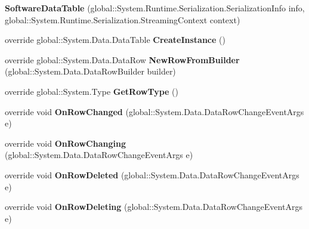 \begin{DoxyCompactItemize}
\item 
{\bfseries Software\+Data\+Table} (global\+::\+System.\+Runtime.\+Serialization.\+Serialization\+Info info, global\+::\+System.\+Runtime.\+Serialization.\+Streaming\+Context context)\hypertarget{class_products_1_1_data_1_1ds_sage_1_1_software_data_table_a21290d753abcb951ecbcf30235f61fa4}{}\label{class_products_1_1_data_1_1ds_sage_1_1_software_data_table_a21290d753abcb951ecbcf30235f61fa4}

\item 
override global\+::\+System.\+Data.\+Data\+Table {\bfseries Create\+Instance} ()\hypertarget{class_products_1_1_data_1_1ds_sage_1_1_software_data_table_acdc99b08466fa9d667b12b3eeaae30e8}{}\label{class_products_1_1_data_1_1ds_sage_1_1_software_data_table_acdc99b08466fa9d667b12b3eeaae30e8}

\item 
override global\+::\+System.\+Data.\+Data\+Row {\bfseries New\+Row\+From\+Builder} (global\+::\+System.\+Data.\+Data\+Row\+Builder builder)\hypertarget{class_products_1_1_data_1_1ds_sage_1_1_software_data_table_a4c9b406f366788eb3f6344f287d3d9a5}{}\label{class_products_1_1_data_1_1ds_sage_1_1_software_data_table_a4c9b406f366788eb3f6344f287d3d9a5}

\item 
override global\+::\+System.\+Type {\bfseries Get\+Row\+Type} ()\hypertarget{class_products_1_1_data_1_1ds_sage_1_1_software_data_table_aa6852295cfe18ea9c7f15f12050b0051}{}\label{class_products_1_1_data_1_1ds_sage_1_1_software_data_table_aa6852295cfe18ea9c7f15f12050b0051}

\item 
override void {\bfseries On\+Row\+Changed} (global\+::\+System.\+Data.\+Data\+Row\+Change\+Event\+Args e)\hypertarget{class_products_1_1_data_1_1ds_sage_1_1_software_data_table_adf1da4e145aba2fa457c8f63d485d131}{}\label{class_products_1_1_data_1_1ds_sage_1_1_software_data_table_adf1da4e145aba2fa457c8f63d485d131}

\item 
override void {\bfseries On\+Row\+Changing} (global\+::\+System.\+Data.\+Data\+Row\+Change\+Event\+Args e)\hypertarget{class_products_1_1_data_1_1ds_sage_1_1_software_data_table_a8f97f288f9316e3a60a08df4bfe17f4b}{}\label{class_products_1_1_data_1_1ds_sage_1_1_software_data_table_a8f97f288f9316e3a60a08df4bfe17f4b}

\item 
override void {\bfseries On\+Row\+Deleted} (global\+::\+System.\+Data.\+Data\+Row\+Change\+Event\+Args e)\hypertarget{class_products_1_1_data_1_1ds_sage_1_1_software_data_table_a57064808be0214bd49eca924d556b805}{}\label{class_products_1_1_data_1_1ds_sage_1_1_software_data_table_a57064808be0214bd49eca924d556b805}

\item 
override void {\bfseries On\+Row\+Deleting} (global\+::\+System.\+Data.\+Data\+Row\+Change\+Event\+Args e)\hypertarget{class_products_1_1_data_1_1ds_sage_1_1_software_data_table_a44039726b2ec4d43769a3159764553cb}{}\label{class_products_1_1_data_1_1ds_sage_1_1_software_data_table_a44039726b2ec4d43769a3159764553cb}

\end{DoxyCompactItemize}
